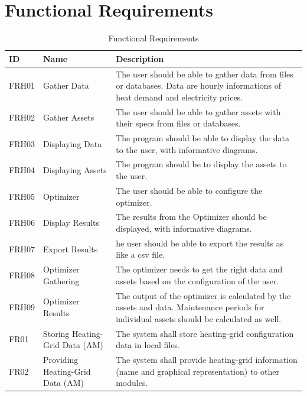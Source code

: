 \section*{Functional Requirements}
\begin{table}[H]
    \centering
    \caption{Functional Requirements}
    \begin{tabular}{|p{1.3cm}|p{3.5cm}|p{9.5cm}|}   
        \hline
        \cellcolor[HTML]{BFBFBF} ID & \cellcolor[HTML]{BFBFBF} Name & \cellcolor[HTML]{BFBFBF} Description \\
        \hline
        FRH01 & Gather Data & The user should be able to gather data from files or databases. Data are hourly informations of heat demand and electricity prices. \\
        \hline
        FRH02 & Gather Assets & The user should be able to gather assets with their specs from files or databases. \\
        \hline
        FRH03 & Displaying Data & The program should be able to display the data to the user, with informative diagrams. \\
        \hline
        FRH04 & Displaying Assets & The program should be to display the assets to the user. \\
        \hline
        FRH05 & Optimizer & The user should be able to configure the optimizer. \\
        \hline
        FRH06 & Display Results & The results from the Optimizer should be displayed, with informative diagrams. \\
        \hline
        FRH07 & Export Results & he user should be able to export the results as like a csv file. \\
        \hline
        FRH08 & Optimizer Gathering & The optimizer needs to get the right data and assets based on the configuration of the user. \\
        \hline
        FRH09 & Optimizer Results & The output of the optimizer is calculated by the assets and data. Maintenance periods for individual assets should be calculated as well. \\
        \hline
        FR01 & Storing Heating-Grid Data (AM) & The system shall store heating-grid configuration data in local files. \\
        \hline
        FR02 & Providing Heating-Grid Data (AM) & The system shall provide heating-grid information (name and graphical representation) to other modules. \\
        \hline
    \end{tabular}
\end{table}
